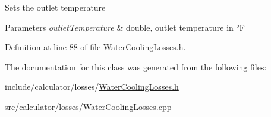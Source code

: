 Sets the outlet temperature 
\begin{DoxyParams}{Parameters}
{\em outlet\+Temperature} & double, outlet temperature in °F \\
\hline
\end{DoxyParams}


Definition at line 88 of file Water\+Cooling\+Losses.\+h.



The documentation for this class was generated from the following files\+:\begin{DoxyCompactItemize}
\item 
include/calculator/losses/\hyperlink{_water_cooling_losses_8h}{Water\+Cooling\+Losses.\+h}\item 
src/calculator/losses/Water\+Cooling\+Losses.\+cpp\end{DoxyCompactItemize}
